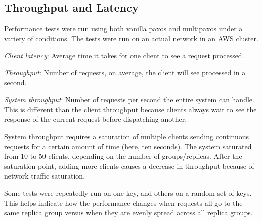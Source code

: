 \documentclass[letterpaper,10pt]{article}
\begin{document}
\subsection{Throughput and Latency}

Performance tests were run using both vanilla paxos and multipaxos under a variety of conditions. The tests were run on an actual network in an AWS cluster. 

\textit{Client latency}: Average time it takes for one client to see a
request processed. 

\textit{Throughput}: Number of requests, on average, the
client will see processed in a second.

\textit{System throughput}: Number of requests per second the entire system can handle. This is different than the client throughput because clients always wait to see the response of the current request before dispatching another.

System throughput requires a saturation of multiple clients sending continuous requests for a certain amount of time (here, ten seconds). The system saturated from 10 to 50 clients, depending on the number of groups/replicas. After the saturation point, adding more clients
causes a decrease in throughput because of network traffic saturation.

Some tests were repeatedly run on one key, and others on a random set of keys. This helps indicate how the performance changes when requests all go to the same replica group versus when they are evenly spread across all replica groups.
\end{document}

